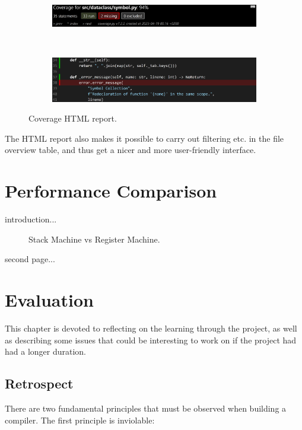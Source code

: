 \begin{figure}[H]
    \centering
    \begin{subfigure}{1\textwidth}
        \centering
        \includegraphics[width=1\textwidth]{misc/images/Coverage_Panel.png}
        \end{subfigure}\\
        \begin{subfigure}{1\textwidth}
        \centering
        \includegraphics[width=1\textwidth]{misc/images/Coverage_Info.png}
        \end{subfigure}
    \caption{Coverage HTML report.}
\end{figure}

The HTML report also makes it possible to carry out filtering etc. in the file overview table, and thus get a nicer and more user-friendly interface.

\chapter{Performance Comparison}
introduction...

\begin{figure}[H]
    \centering
    
    \caption{Stack Machine vs Register Machine.}
    \label{fig:performance_comparison}
\end{figure}

\newpage

second page...


\chapter{Evaluation}
This chapter is devoted to reflecting on the learning through the project, as well as describing some issues that could be interesting to work on if the project had had a longer duration.

\section{Retrospect}
There are two fundamental principles that must be observed when building a compiler. The first principle is inviolable:


